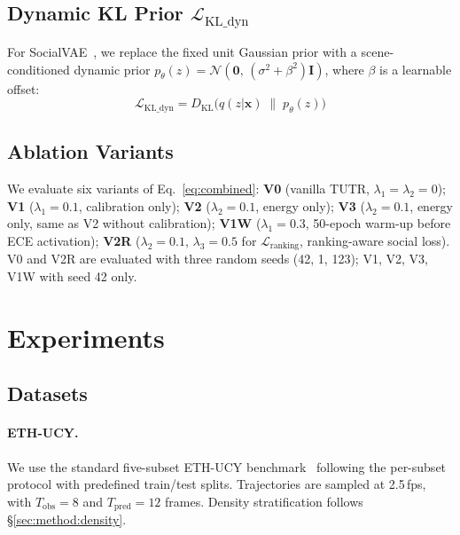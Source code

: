 \documentclass{article}
\begin{document}
\subsection{Dynamic KL Prior \(\mathcal{L}_{\text{KL\_dyn}}\)}
\label{sec:method:kl}

For SocialVAE~\cite{xu2022socialvae}, we replace the fixed unit Gaussian prior
with a scene-conditioned dynamic prior
\(p_\theta(z) = \mathcal{N}(\mathbf{0},\, (\sigma^2 + \beta^2)\mathbf{I})\),
where \(\beta\) is a learnable offset:
%
\begin{equation}
  \mathcal{L}_{\text{KL\_dyn}} = D_{\text{KL}}\!\bigl(
    q(z|\mathbf{x}) \;\|\; p_\theta(z)\bigr)
  \label{eq:lkl}
\end{equation}

\subsection{Ablation Variants}
\label{sec:method:combined}

We evaluate six variants of Eq.~\eqref{eq:combined}: \textbf{V0} (vanilla
TUTR, \(\lambda_1\!=\!\lambda_2\!=\!0\)); \textbf{V1} (\(\lambda_1\!=\!0.1\),
calibration only); \textbf{V2} (\(\lambda_2\!=\!0.1\), energy only);
\textbf{V3} (\(\lambda_2\!=\!0.1\), energy only, same as V2 without
calibration); \textbf{V1W} (\(\lambda_1\!=\!0.3\), 50-epoch warm-up before
ECE activation); \textbf{V2R} (\(\lambda_2\!=\!0.1\),
\(\lambda_3\!=\!0.5\) for \(\mathcal{L}_{\text{ranking}}\), ranking-aware
social loss). V0 and V2R are evaluated with three random seeds (42, 1, 123);
V1, V2, V3, V1W with seed 42 only.


\section{Experiments}
\label{sec:experiments}

\subsection{Datasets}
\label{sec:exp:datasets}

\paragraph{ETH-UCY.}
We use the standard five-subset ETH-UCY
benchmark~\cite{pellegrini2009eth,lerner2007ucy} following the per-subset
protocol with predefined train/test splits. Trajectories are sampled at
2.5\,fps, with \(T_{\text{obs}}=8\) and \(T_{\text{pred}}=12\) frames.
Density stratification follows \S\ref{sec:method:density}.
\end{document}
